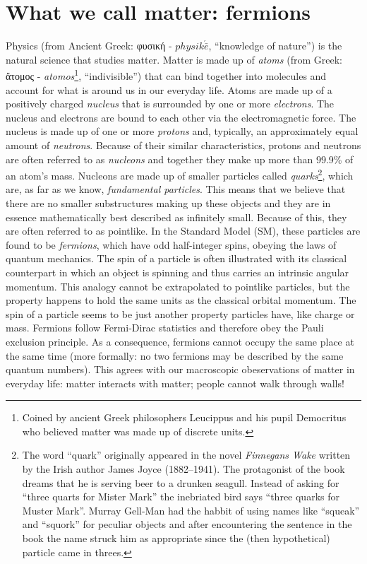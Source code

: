 \section{What we call matter: fermions}
\label{sec:fermions}
Physics (from Ancient Greek: \gr φυσική \en - $physik\acute{\bar{e}}$, ``knowledge of nature'') is the natural science that studies matter.
Matter is made up of \textit{atoms} (from Greek: \gr ἄτομος \en - \textit{atomos}\footnote{Coined by ancient Greek philosophers Leucippus and his pupil Democritus who believed matter was made up of discrete units.}, ``indivisible'') that can bind together into molecules and account for what is around us in our everyday life.
Atoms are made up of a positively charged \textit{nucleus} that is surrounded by one or more \textit{electrons}. The nucleus and electrons are bound to each other via the electromagnetic force.
The nucleus is made up of one or more \textit{protons} and, typically, an approximately equal amount of \textit{neutrons}. Because of their similar characteristics, protons and neutrons are often referred to as \textit{nucleons} and together they make up more than 99.9\% of an atom's mass.
Nucleons are made up of smaller particles called \textit{quarks}\footnote{The word ``quark'' originally appeared in the novel \textit{Finnegans Wake} written by the Irish author James Joyce (1882–1941). The protagonist of the book dreams that he is serving beer to a drunken seagull. Instead of asking for ``three quarts for Mister Mark'' the inebriated bird says ``three quarks for Muster Mark''. Murray Gell-Man had the habbit of using names like ``squeak'' and ``squork'' for peculiar objects and after encountering the sentence in the book the name struck him as appropriate since the (then hypothetical) particle came in threes.}, which are, as far as we know, \textit{fundamental particles}. This means that we believe that there are no smaller substructures making up these objects and they are in essence mathematically best described as infinitely small.
Because of this, they are often referred to as pointlike.
In the Standard Model (SM), these particles are found to be \textit{fermions}, which have odd half-integer spins, obeying the laws of quantum mechanics.
The spin of a particle is often illustrated with its classical counterpart in which an object is spinning and thus carries an intrinsic angular momentum.
This analogy cannot be extrapolated to pointlike particles, but the property happens to hold the same units as the classical orbital momentum.
The spin of a particle seems to be just another property particles have, like charge or mass.
Fermions follow Fermi-Dirac statistics and therefore obey the Pauli exclusion principle. As a consequence, fermions cannot occupy the same place at the same time (more formally: no two fermions may be described by the same quantum numbers). This agrees with our macroscopic obeservations of matter in everyday life: matter interacts with matter; people cannot walk through walls!

